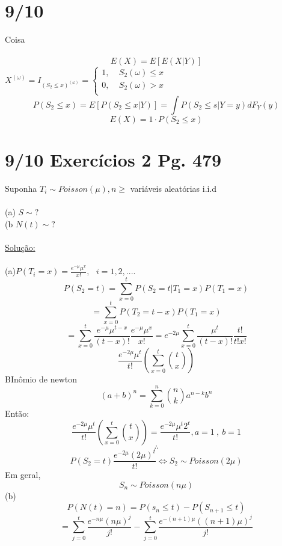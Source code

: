 \documentclass[a4paper,12pt]{article}
\begin{document}
          \section*{9/10}
          Coisa
          \\
          \\
          $$E(X)=E[E(X|Y)] $$
          $X^{(\omega)}=I_{(S_2\le x)^{(\omega)}}=\begin{cases*}
          1, \ \ \ \ \ S_2(\omega)\le x\\
                    0, \ \ \ \ \ S_2(\omega) >x\\
          \end{cases*}$
          $$P(S_2\le x)=E[P(S_2\le x|Y)] =\int P(S_2\le s|Y=y)dF_Y(y)$$
          $$E(X)=1\cdot P(S_2\le x) $$
          \newpage\section*{9/10 Exercícios 2 Pg. 479}
          Suponha $ T_i\sim Poisson(\mu),n\ge$ variáveis aleatórias i.i.d\\
          \\
          (a) $ S\sim ?$\\
          (b $ N(t)\sim ?$\\
          \\
          \underline{Solução:}\\
          \\
          (a)$P(T_i=x)=\frac{e^{-\mu}\mu^x}{x!}, \ \ \ i=1,2,....$\\
          $$P(S_2=t)=\sum\limits_{x=0}^{t}P(S_2=t|T_1=x)P(T_1=x)$$
                    $$=\sum\limits_{x=0}^{t}P(T_2=t-x)P(T_1=x)$$
                    $$=\sum\limits_{x=0}^{t}\frac{e^{-\mu}\mu^{t-x}}{(t-x)!}\frac{e^{-\mu}\mu^x}{x!}=
                    e^{-2\mu}\sum\limits_{x=0}^{t}\frac{\mu^{t}}{(t-x)!}\frac{t!}{t!x!} $$
                    $$\frac{e^{-2\mu}\mu^t}{t!}\left(\sum\limits_{x=0}^{t}\binom{t}{x}\right) $$
                    BInômio de newton
                    $$(a+b)^n=\sum\limits_{k=0}^{n}\binom{n}{k}a^{n-k}b^n $$
                    Então:
                                        $$\frac{e^{-2\mu}\mu^t}{t!}\left(\sum\limits_{x=0}^{t}\binom{t}{x}\right)= \frac{e^{-2\mu}\mu^t2^t}{t!}, a=1\ , \ b=1$$
                                        $$\therefore $$
                                        $$P(S_2=t)\frac{e^{-2\mu}(2\mu)^t}{t!}\iff S_2\sim Poisson(2\mu)$$
                                        Em geral,
                                        $$S_n\sim Poisson(n\mu) $$
                                        (b)
                                        $$P(N(t)=n)=P(s_n\le t)-P(S_{n+1}\le t) $$
                                        $$=\sum\limits_{j=0}^{t}\frac{e^{-n\mu}(n\mu)^j}{j!}-\sum\limits_{j=0}^{t}\frac{e^{-(n+1)\mu}((n+1)\mu)^j}{j!} $$
                                        
\end{document}
